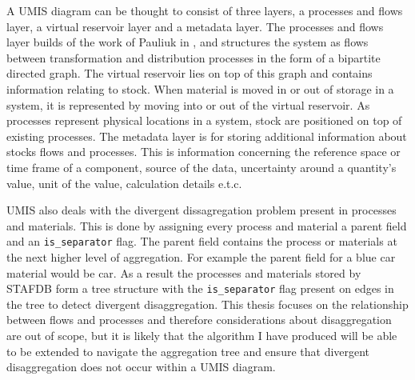 \documentclass[ %
                    author={Tom Jager},
                supervisor={Dr. Daniel Schien},
                    degree={MEng},
                     title={A Bayesian Inference Engine for UMIS Structured Data},
                  subtitle={},
                      type={research},
                      year={2019} ]{dissertation}
\begin{document}
A UMIS diagram can be thought to consist of three layers, a processes and flows layer, a virtual reservoir layer and a metadata layer. The processes and flows layer builds of the work of Pauliuk in \cite{pauliuk2015general}, and structures the system as flows between transformation and distribution processes in the form of a bipartite directed graph. The virtual reservoir lies on top of this graph and contains information relating to stock. When material is moved in or out of storage in a system, it is represented by moving into or out of the virtual reservoir. As processes represent physical locations in a system, stock are positioned on top of existing processes. The metadata layer is for storing additional information about stocks flows and processes. This is information concerning the reference space or time frame of a component, source of the data, uncertainty around a quantity's value, unit of the value, calculation details e.t.c.

UMIS also deals with the divergent dissagregation problem present in processes and materials. This is done by assigning every process and material a parent field and an \texttt{is\_separator} flag. The parent field contains the process or materials at the next higher level of aggregation. For example the parent field for a blue car material would be car. As a result the processes and materials stored by STAFDB form a tree structure with the \texttt{is\_separator} flag present on edges in the tree to detect divergent disaggregation. This thesis focuses on the relationship between flows and processes and therefore considerations about disaggregation are out of scope, but it is likely that the algorithm I have produced will be able to be extended to navigate the aggregation tree and ensure that divergent disaggregation does not occur within a UMIS diagram.
\end{document}
